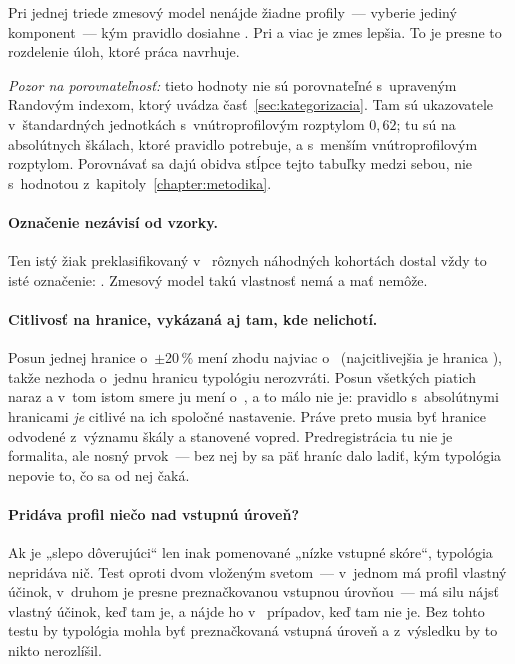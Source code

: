 Pri jednej triede zmesový model nenájde žiadne profily~--- vyberie jediný
komponent~--- kým pravidlo dosiahne \asmRuleAriClass. Pri \asmNStudy{} a viac je
zmes lepšia. To je presne to rozdelenie úloh, ktoré práca navrhuje.

\emph{Pozor na porovnateľnosť:} tieto hodnoty nie sú porovnateľné s~upraveným
Randovým indexom, ktorý uvádza časť~\ref{sec:kategorizacia}. Tam sú ukazovatele
v~štandardných jednotkách s~vnútroprofilovým rozptylom $0{,}62$; tu sú na
absolútnych škálach, ktoré pravidlo potrebuje, a s~menším vnútroprofilovým
rozptylom. Porovnávať sa dajú obidva stĺpce tejto tabuľky medzi sebou, nie
s~hodnotou z~kapitoly~\ref{chapter:metodika}.

\paragraph{Označenie nezávisí od vzorky.} Ten istý žiak preklasifikovaný
v~\asmLabelCohorts{} rôznych náhodných kohortách dostal vždy to isté označenie:
\asmLabelStable{}. Zmesový model takú vlastnosť nemá a mať nemôže.

\paragraph{Citlivosť na hranice, vykázaná aj tam, kde nelichotí.} Posun jednej
hranice o~$\pm$20\,\% mení zhodu najviac o~\asmCutSingle{} (najcitlivejšia je
hranica \asmCutWorst), takže nezhoda o~jednu hranicu typológiu nerozvráti. Posun
všetkých piatich naraz a v~tom istom smere ju mení o~\asmCutJoint{}, a to málo
nie je: pravidlo s~absolútnymi hranicami \emph{je} citlivé na ich spoločné
nastavenie. Práve preto musia byť hranice odvodené z~významu škály a stanovené
vopred. Predregistrácia tu nie je formalita, ale nosný prvok~--- bez nej by sa päť
hraníc dalo ladiť, kým typológia nepovie to, čo sa od nej čaká.

\paragraph{Pridáva profil niečo nad vstupnú úroveň?} Ak je „slepo dôverujúci“ len
inak pomenované „nízke vstupné skóre“, typológia nepridáva nič. Test oproti
dvom vloženým svetom~--- v~jednom má profil vlastný účinok, v~druhom je presne
preznačkovanou vstupnou úrovňou~--- má silu \asmIncPower{} nájsť vlastný účinok,
keď tam je, a nájde ho v~\asmIncFalsePos{} prípadov, keď tam nie je. Bez tohto
testu by typológia mohla byť preznačkovaná vstupná úroveň a z~výsledku by to nikto
nerozlíšil.

